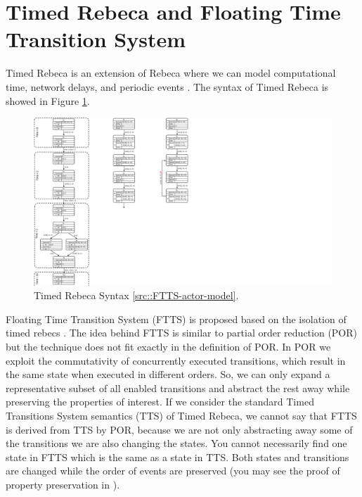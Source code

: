 \section{Timed Rebeca and Floating Time Transition System} \label{sec::FTTS}

Timed Rebeca is an extension of Rebeca where we can model computational time, network delays, and periodic events \cite{DBLP:journals/scp/ReynissonSACJIS14,DBLP:conf/birthday/SirjaniK16}.
The syntax of Timed Rebeca is showed in Figure \ref{fig::TRebecaSyntax}.

\begin{figure}
\centering
\includegraphics[width=.15\textwidth]{resources/BFTTS.pdf}
\caption{ Timed Rebeca Syntax \ref{src::FTTS-actor-model}.}
\label{fig::TRebecaSyntax}
\end{figure}

Floating Time Transition System (FTTS) is proposed based on the isolation of timed rebecs \cite{DBLP:conf/facs2/KhamespanahSVK15,DBLP:journals/scp/KhamespanahSSKI15}. The idea behind FTTS is similar to partial order reduction (POR) but the technique does not fit exactly in the definition of POR. 
%
In POR we exploit the commutativity of concurrently executed transitions, which result in the same state when executed in different orders. So, we can only expand a representative subset of all enabled transitions and abstract the rest away while preserving the properties of interest. %
%
If we consider the standard Timed Transitions System semantics (TTS) of Timed Rebeca, we cannot say that FTTS is derived from TTS by POR, because we are not only abstracting away some of the transitions we are also changing the states. You cannot necessarily find one state in FTTS which is the same as a state in TTS. Both states and transitions are changed while the order of events are preserved (you may see the proof of property preservation in \cite{DBLP:conf/facs2/KhamespanahSVK15}).
%

